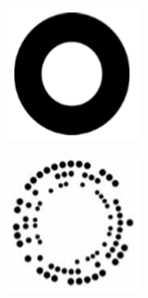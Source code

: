 \clearpage
\begin{figure}[htb]
	\begin{minipage}[t]{0.33\linewidth}
		\centering
		\includegraphics[width=\columnwidth]{figures/2-8a.png} 
		\label{fig:2-8a} 
	\end{minipage}
	\begin{minipage}[t]{0.33\linewidth} 
		\centering
		\includegraphics[width=\columnwidth]{figures/2-8b.png} 

\end{minipage}
\end{figure}
